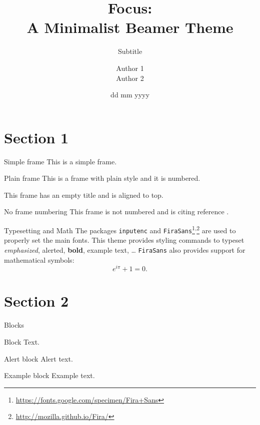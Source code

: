 \documentclass{beamer}
\title{Focus: \\ A Minimalist Beamer Theme}
\subtitle{Subtitle}
\author{Author 1 \\ Author 2}
\institute{Institute Name \\ Institute Address}
\date{dd mm yyyy}
\begin{document}
    \begin{frame}
        \maketitle
    \end{frame}
    
    \section{Section 1}
    \begin{frame}{Simple frame}
        This is a simple frame.
    \end{frame}

    \begin{frame}[plain]{Plain frame}
        This is a frame with plain style and it is numbered.
    \end{frame}
    
    \begin{frame}[t]
        This frame has an empty title and is aligned to top.
    \end{frame}
    
    \begin{frame}[noframenumbering]{No frame numbering}
        This frame is not numbered and is citing reference \cite{knuth74}.
    \end{frame}
    
    \begin{frame}{Typesetting and Math}
        The packages \texttt{inputenc} and \texttt{FiraSans}\footnote{\url{https://fonts.google.com/specimen/Fira+Sans}}\textsuperscript{,}\footnote{\url{http://mozilla.github.io/Fira/}} are used to properly set the main fonts.
        \vfill
        This theme provides styling commands to typeset \emph{emphasized}, \alert{alerted}, \textbf{bold}, \textcolor{example}{example text}, \dots
        \vfill
        \texttt{FiraSans} also provides support for mathematical symbols:
        \begin{equation*}
            e^{i\pi} + 1 = 0.
        \end{equation*}
    \end{frame}

    \section{Section 2}
    \begin{frame}{Blocks}
        \begin{block}{Block}
            Text.
        \end{block}
        \pause
        \begin{alertblock}{Alert block}
            Alert \alert{text}.
        \end{alertblock}
        \pause
        \begin{exampleblock}{Example block}
            Example \textcolor{example}{text}.
        \end{exampleblock}
    \end{frame}
    
\end{document}
